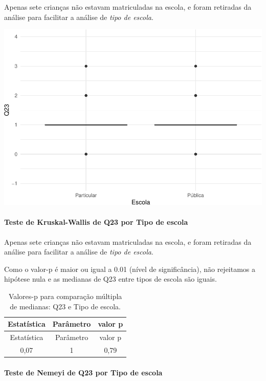 \documentclass[]{article}
\let\oldparagraph\paragraph
\renewcommand{\paragraph}[1]{\oldparagraph{#1}\mbox{}}
\begin{document}
Apenas sete crianças não estavam matriculadas na escola, e foram retiradas da análise para facilitar a análise de \emph{tipo de escola}.

\begin{center}\includegraphics[width=0.75\linewidth]{relatorio_covid19_files/figure-latex/unnamed-chunk-589-1} \end{center}

\hypertarget{teste-de-kruskal-wallis-de-q23-por-tipo-de-escola}{%
\paragraph{Teste de Kruskal-Wallis de Q23 por Tipo de escola}\label{teste-de-kruskal-wallis-de-q23-por-tipo-de-escola}}

Apenas sete crianças não estavam matriculadas na escola, e foram retiradas da análise para facilitar a análise de \emph{tipo de escola}.

Como o valor-p é maior ou igual a 0.01 (nível de significância), não rejeitamos a hipótese nula e as medianas de Q23 entre tipos de escola são iguais.

\begin{longtable}[]{@{}ccc@{}}
\caption{\label{tab:unnamed-chunk-591}Valores-p para comparação múltipla de medianas: Q23 e Tipo de escola.}\tabularnewline
\toprule
Estatística & Parâmetro & valor p\tabularnewline
\midrule
\endfirsthead
\toprule
Estatística & Parâmetro & valor p\tabularnewline
\midrule
\endhead
0,07 & 1 & 0,79\tabularnewline
\bottomrule
\end{longtable}

\hypertarget{teste-de-nemeyi-de-q23-por-tipo-de-escola}{%
\paragraph{Teste de Nemeyi de Q23 por Tipo de escola}\label{teste-de-nemeyi-de-q23-por-tipo-de-escola}}
\end{document}
